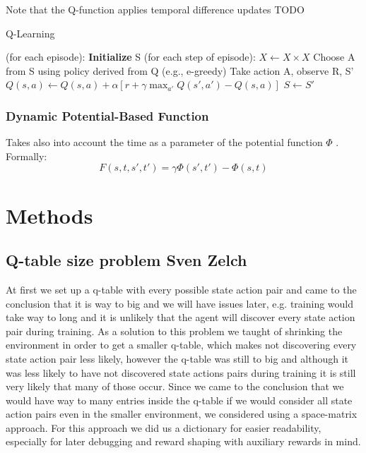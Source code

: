 \documentclass[
	letterpaper, %
	12pt, %
]{CSUniSchoolLabReport}
\begin{document}
Note that the Q-function applies temporal difference updates TODO


\begin{algorithm}[H]
	\caption{Q-Learning}\label{alg:cap}
	\begin{algorithmic}

		\Repeat (for each episode):
		\State \textbf{Initialize} S
		\Repeat (for each step of episode):
		\State $X \gets X \times X$
		\State Choose A from S using policy derived from Q (e.g., e-greedy)
		\State Take action A, observe R, S'
		\State $Q(s,a) \gets Q(s,a) + \alpha[r + \gamma \max_{a'} Q(s', a') - Q(s,a)]$
		\State $S \gets S'$
		\Until{}
	\end{algorithmic}
\end{algorithm}

\subsubsection{Dynamic Potential-Based Function}
Takes also into account the time as a parameter of the potential function $\Phi$ \cite{DynRewardShaping}.
Formally:
\[ F(s,t,s',t') = \gamma \Phi(s', t') - \Phi(s, t) \]


\section{Methods}

\subsection{Q-table size problem \tiny Sven Zelch}

At first we set up a q-table with every possible state action pair and came to the conclusion that it is way to big and we will have issues later, e.g. training would take way to long and it is unlikely that the agent will discover every state action pair during training.
As a solution to this problem we taught of shrinking the environment in order to get a smaller q-table, which makes not discovering every state action pair less likely, however the q-table was still to big and although it was less likely to have not discovered state actions pairs during training it is still very likely that many of those occur.
Since we came to the conclusion that we would have way to many entries inside the q-table if we would consider all state action pairs even in the smaller environment, we considered using a space-matrix approach.
For this approach we did us a dictionary for easier readability, especially for later debugging and reward shaping with auxiliary rewards in mind.
\end{document}
